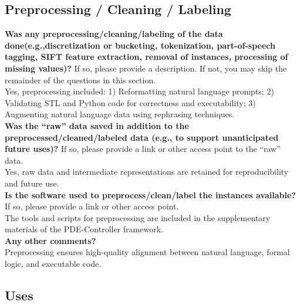 \subsection{Preprocessing / Cleaning / Labeling}

    \textcolor{\sectioncolor}{\textbf{Was any preprocessing/cleaning/labeling of the data
    done(e.g.,discretization or bucketing, tokenization, part-of-speech
    tagging, SIFT feature extraction, removal of instances, processing of
    missing values)?
    }
    If so, please provide a description. If not, you may skip the remainder of
    the questions in this section.
    } \\
    Yes, preprocessing included:
1) Reformatting natural language prompts;
2) Validating STL and Python code for correctness and executability;
3) Augmenting natural language data using rephrasing techniques. \\

    \textcolor{\sectioncolor}{\textbf{Was the “raw” data saved in addition to the preprocessed/cleaned/labeled
    data (e.g., to support unanticipated future uses)?
    }
    If so, please provide a link or other access point to the “raw” data.
    } \\
    Yes, raw data and intermediate representations are retained for reproducibility and future use. \\

    \textcolor{\sectioncolor}{\textbf{Is the software used to preprocess/clean/label the instances available?
    }
    If so, please provide a link or other access point.
    } \\
    The tools and scripts for preprocessing are included in the supplementary materials of the PDE-Controller framework. \\

    \textcolor{\sectioncolor}{\textbf{Any other comments?
    }} \\
    Preprocessing ensures high-quality alignment between natural language, formal logic, and executable code. \\

\subsection{Uses}


